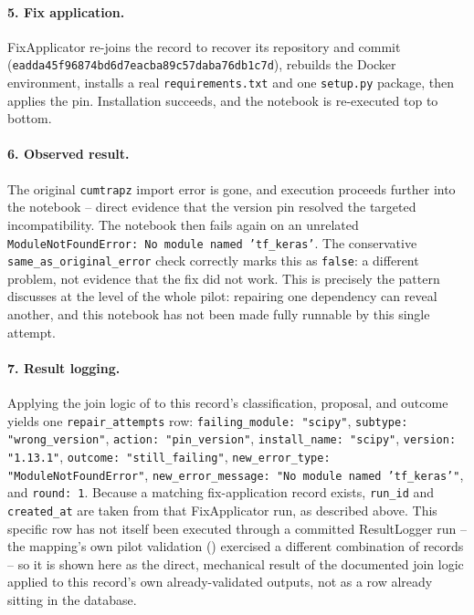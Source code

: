 \paragraph{5. Fix application.} FixApplicator re-joins the record to recover
its repository and commit
(\texttt{eadda45f96874bd6d7eacba89c57daba76db1c7d}), rebuilds the Docker
environment, installs a real \texttt{requirements.txt} and one
\texttt{setup.py} package, then applies the pin. Installation succeeds, and
the notebook is re-executed top to bottom.

\paragraph{6. Observed result.} The original \texttt{cumtrapz} import error
is gone, and execution proceeds further into the notebook -- direct
evidence that the version pin resolved the targeted incompatibility. The
notebook then fails again on an unrelated
\texttt{ModuleNotFoundError: No module named 'tf\_keras'}. The conservative
\texttt{same\_as\_original\_error} check correctly marks this as
\texttt{false}: a different problem, not evidence that the fix did not
work. This is precisely the pattern  discusses
at the level of the whole pilot: repairing one dependency can reveal
another, and this notebook has not been made fully runnable by this single
attempt.

\paragraph{7. Result logging.} Applying the join logic of
 to this record's classification, proposal, and
outcome yields one \texttt{repair\_attempts} row:
\texttt{failing\_module: "scipy"}, \texttt{subtype: "wrong\_version"},
\texttt{action: "pin\_version"}, \texttt{install\_name: "scipy"},
\texttt{version: "1.13.1"}, \texttt{outcome: "still\_failing"},
\texttt{new\_error\_type: "ModuleNotFoundError"},
\texttt{new\_error\_message: "No module named 'tf\_keras'"}, and
\texttt{round: 1}. Because a matching fix-application record exists,
\texttt{run\_id} and \texttt{created\_at} are taken from that FixApplicator
run, as described above. This specific row has not itself been executed
through a committed ResultLogger run -- the mapping's own pilot validation
() exercised a different combination of records -- so it is
shown here as the direct, mechanical result of the documented join logic
applied to this record's own already-validated outputs, not as a row
already sitting in the database.

